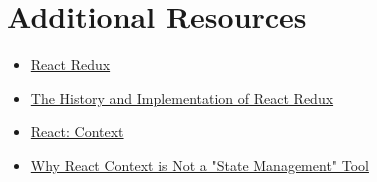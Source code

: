 \section{Additional Resources}

\begin{itemize}[leftmargin=*]
    \item \href{https://react-redux.js.org}{React Redux}
    \item \href{https://blog.isquaredsoftware.com/2018/11/react-redux-history-implementation/}{The History and Implementation of React Redux}
    \item \href{http://reactjs.org/docs/context.html}{React: Context}
    \item \href{https://blog.isquaredsoftware.com/2021/01/blogged-answers-why-react-context-is-not-a-state-management-tool-and-why-it-doesnt-replace-redux/}{Why React Context is Not a "State Management" Tool}
\end{itemize}
